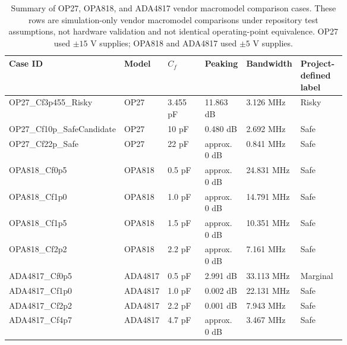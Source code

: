 \begin{table}[htbp]
\centering
\small
\caption{Summary of OP27, OPA818, and ADA4817 vendor macromodel comparison cases. These rows are simulation-only vendor macromodel comparisons under repository test assumptions, not hardware validation and not identical operating-point equivalence. OP27 used $\pm 15$ V supplies; OPA818 and ADA4817 used $\pm 5$ V supplies.}
\label{tab:vendor-summary}
\begin{tabularx}{\linewidth}{p{0.20\linewidth} p{0.11\linewidth} p{0.11\linewidth} p{0.12\linewidth} p{0.12\linewidth} X}
\toprule
Case ID & Model & $C_f$ & Peaking & Bandwidth & Project-defined label \\
\midrule
OP27\_Cf3p455\_Risky & OP27 & 3.455 pF & 11.863 dB & 3.126 MHz & Risky \\
OP27\_Cf10p\_SafeCandidate & OP27 & 10 pF & 0.480 dB & 2.692 MHz & Safe \\
OP27\_Cf22p\_Safe & OP27 & 22 pF & approx. 0 dB & 0.841 MHz & Safe \\
OPA818\_Cf0p5 & OPA818 & 0.5 pF & approx. 0 dB & 24.831 MHz & Safe \\
OPA818\_Cf1p0 & OPA818 & 1.0 pF & approx. 0 dB & 14.791 MHz & Safe \\
OPA818\_Cf1p5 & OPA818 & 1.5 pF & approx. 0 dB & 10.351 MHz & Safe \\
OPA818\_Cf2p2 & OPA818 & 2.2 pF & approx. 0 dB & 7.161 MHz & Safe \\
ADA4817\_Cf0p5 & ADA4817 & 0.5 pF & 2.991 dB & 33.113 MHz & Marginal \\
ADA4817\_Cf1p0 & ADA4817 & 1.0 pF & 0.002 dB & 22.131 MHz & Safe \\
ADA4817\_Cf2p2 & ADA4817 & 2.2 pF & 0.001 dB & 7.943 MHz & Safe \\
ADA4817\_Cf4p7 & ADA4817 & 4.7 pF & approx. 0 dB & 3.467 MHz & Safe \\
\bottomrule
\end{tabularx}
\end{table}

